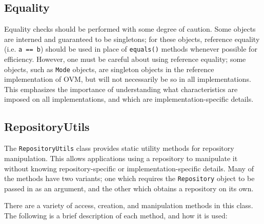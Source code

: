 \documentclass{report}
\begin{document}
\subsection{Equality}\label{equals}

Equality checks should be performed with some degree of
caution. Some objects are interned and guaranteed to be singletons; for these
objects, reference equality (i.e. \texttt{a == b}) should be used
in place of \texttt{equals()} methods whenever possible for 
efficiency. However, one must be careful about using reference
equality; some objects, such as \texttt{Mode} objects, are singleton
objects in the reference implementation of OVM, but will not necessarily
be so in all implementations. This emphasizes the importance of
understanding what characteristics are imposed on all implementations,
and which are implementation-specific details.

\subsection{RepositoryUtils}\label{reputils}

The \texttt{RepositoryUtils} class provides static utility methods for 
repository manipulation. This allows applications using a repository to 
manipulate it without knowing repository-specific or implementation-specific 
details. Many of the methods have two variants; one which requires the 
\texttt{Repository} object to be passed in as an argument, and the other
which obtains a repository on its own.

There are a variety of access, creation, and manipulation methods in this 
class. The following is a brief description of each method, and how it is
used:
\end{document}
